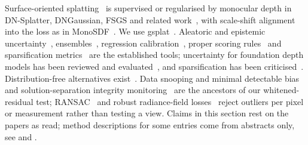 Surface-oriented splatting~\cite{kerbl2023gaussians,huang2024twodgs,guedon2023sugar,yu2024gof,chen2024pgsr} is supervised or regularised by monocular depth in DN-Splatter, DNGaussian, FSGS and related work~\cite{turkulainen2025dnsplatter,li2024dngaussian,zhu2023fsgs,chung2023depthreg,zhang2024corgs}, with scale-shift alignment into the loss as in MonoSDF~\cite{yu2022monosdf}. We use gsplat~\cite{ye2024gsplat}.
Aleatoric and epistemic uncertainty~\cite{kendall2017uncertainties}, ensembles~\cite{lakshminarayanan2017ensembles}, regression calibration~\cite{kuleshov2018calibrated,levi2019evaluating}, proper scoring rules~\cite{gneiting2007scoring} and sparsification metrics~\cite{ilg2018uncertainty,poggi2020uncertainty} are the established tools; uncertainty for foundation depth models has been reviewed and evaluated~\cite{landgraf2025critical}, and sparsification has been criticised~\cite{xiang2023measuring}. Distribution-free alternatives exist~\cite{vovk2022algorithmic,angelopoulos2021gentle,barber2021jackknifeplus}.
Data snooping and minimal detectable bias~\cite{baarda1968testing,teunissen1998mdb,teunissen2024network} and solution-separation integrity monitoring~\cite{blanch2012araim} are the ancestors of our whitened-residual test; RANSAC~\cite{fischler1981ransac} and robust radiance-field losses~\cite{sabour2023robustnerf,sabour2024spotless,martinbrualla2020nerfw} reject outliers per pixel or measurement rather than testing a view.
Claims in this section rest on the papers as read; method descriptions for some entries come from abstracts only, see  and .
